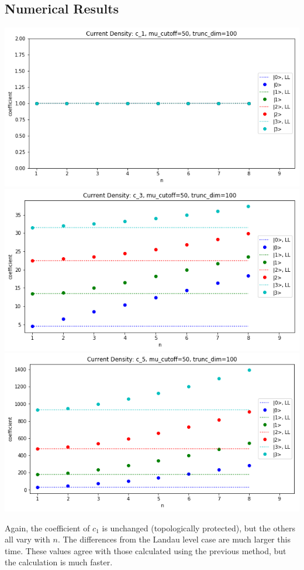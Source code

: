 \documentclass[a4paper, 10pt]{paper}
\begin{document}
\subsection{Numerical Results}
\begin{center}
\includegraphics[scale=0.57]{Density_c1.png}
\includegraphics[scale=0.57]{Density_c3.png}
\includegraphics[scale=0.57]{Density_c5.png}
\end{center}
Again, the coefficient of $c_1$ is unchanged (topologically protected), but the others all vary with $n$. The differences from the Landau level case are much larger this time. These values agree with those calculated using the previous method, but the calculation is much faster.
\end{document}
